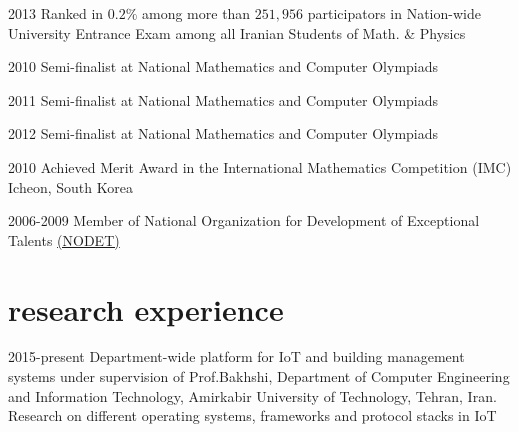 \documentclass[]{friggeri-cv} %
\begin{document}
\begin{entrylist}

	\entry
	{2013}
	{\normalfont Ranked in $0.2\%$ among more than $251,956$ participators in Nation-wide University Entrance Exam among all Iranian Students of Math. \& Physics}
	{}
	{}


	\entry
	{2010}
	{\textcolor{TextOrange}{Semi-finalist} {\normalfont at National Mathematics and Computer Olympiads}}
	{}
	{}


	\entry
	{2011}
	{\textcolor{TextOrange}{Semi-finalist} {\normalfont at National Mathematics and Computer Olympiads}}
	{}
	{}


	\entry
	{2012}
	{\textcolor{TextOrange}{Semi-finalist} {\normalfont at National Mathematics and Computer Olympiads}}
	{}
	{}


	\entry
	{2010}
	{{\normalfont Achieved} \textcolor{Ocean}{Merit Award} {\normalfont in the International Mathematics Competition (IMC) Icheon, South Korea}}
	{}
	{}


	\entry
	{2006-2009}
	{\normalfont Member of National Organization for Development of Exceptional Talents \href{https://en.wikipedia.org/wiki/National_Organization_for_Development_of_Exceptional_Talents}{(NODET)}}
	{}
	{}


\end{entrylist}


\section{research experience}

\begin{entrylist}

	\entry
	{2015-present}
	{Department-wide platform for IoT and building management systems}
	{under supervision of Prof.Bakhshi, Department of Computer Engineering and Information Technology, Amirkabir University of Technology, Tehran, Iran.}
	{Research on different operating systems, frameworks and protocol stacks in IoT}

\end{entrylist}
\end{document}
